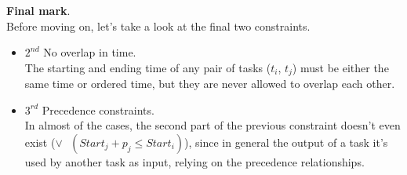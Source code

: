 \begin{example}
    \textbf{Final mark}. \\
    Before moving on, let's take a look at the final two constraints.
    \begin{itemize}
        \renewcommand{\labelitemi}{}
        \item $2^{nd}$ No overlap in time. \\ The starting and ending time of any pair of tasks ($t_i$, $t_j$) must be either the same time or ordered time, but they are never allowed to overlap each other.
        \item $3^{rd}$ Precedence constraints. \\ In almost of the cases, the second part of the previous constraint doesn't even exist (\textit{$\vee \text{ } (Start_j + p_j \leq Start_i)$}), since in general the output of a task it's used by another task as input, relying on the precedence relationships.
    \end{itemize}
\end{example}